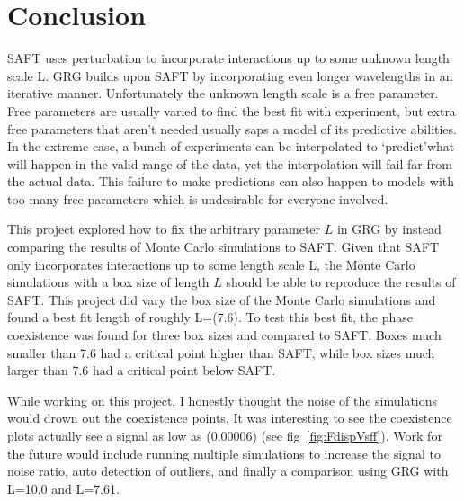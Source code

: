 \section{Conclusion}
SAFT uses perturbation to incorporate interactions up to some unknown length scale L. GRG builds upon SAFT by incorporating even longer wavelengths in an iterative manner. Unfortunately the unknown length scale is a free parameter. Free parameters are usually varied to find the best fit with experiment, but extra free parameters that aren't needed usually saps a model of its predictive abilities. In the extreme case, a bunch of experiments can be interpolated to \lq predict\rq \text{ }what will happen in the valid range of the data, yet the interpolation will fail far from the actual data. This failure to make predictions can also happen to models with too many free parameters which is undesirable for everyone involved.

This project explored how to fix the arbitrary parameter $L$ in GRG by instead comparing the results of Monte Carlo simulations to SAFT. Given that SAFT only incorporates interactions up to some length scale L, the Monte Carlo simulations with a box size of length $L$ should be able to reproduce the results of SAFT. This project did vary the box size of the Monte Carlo simulations and found a best fit length of roughly L=(7.6). To test this best fit, the phase coexistence was found for three box sizes and compared to SAFT. Boxes much smaller than 7.6 had a critical point higher than SAFT, while box sizes much larger than 7.6 had a critical point below SAFT.

While working on this project, I honestly thought the noise of the simulations would drown out the coexistence points. It was interesting to see the coexistence plots actually see a signal as low as (0.00006) (see fig~\ref{fig:FdispVsff}). Work for the future would include running multiple simulations to increase the signal to noise ratio, auto detection of outliers, and finally a comparison using GRG with L=10.0 and L=7.61.